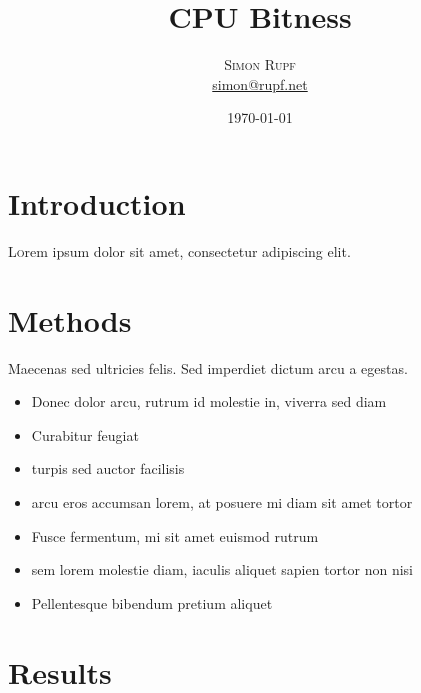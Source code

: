 \documentclass[twoside,twocolumn]{article}
\title{CPU Bitness} %
\author{%
\textsc{Simon Rupf} \\[1ex]
\normalsize \href{mailto:simon@rupf.net}{simon@rupf.net}
}
\date{\today} %
\begin{document}
\maketitle


\section{Introduction}

\lettrine[nindent=0em,lines=3]{L} orem ipsum dolor sit amet, consectetur adipiscing elit.


\section{Methods}

Maecenas sed ultricies felis. Sed imperdiet dictum arcu a egestas. 
\begin{itemize}
\item Donec dolor arcu, rutrum id molestie in, viverra sed diam
\item Curabitur feugiat
\item turpis sed auctor facilisis
\item arcu eros accumsan lorem, at posuere mi diam sit amet tortor
\item Fusce fermentum, mi sit amet euismod rutrum
\item sem lorem molestie diam, iaculis aliquet sapien tortor non nisi
\item Pellentesque bibendum pretium aliquet
\end{itemize}


\section{Results}
\end{document}
